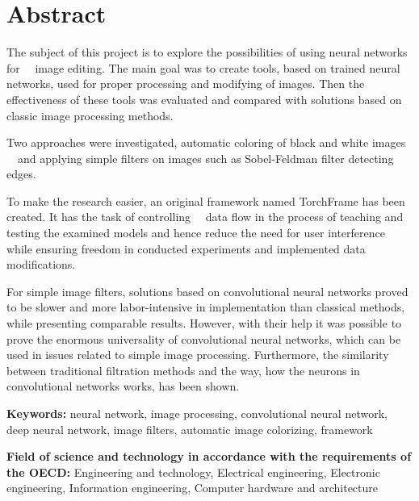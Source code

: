 \section*{Abstract}

  The subject of this project is to explore the possibilities of using neural networks for
  image editing. The main goal was to create tools, based on
  trained neural networks, used for proper processing and modifying of
  images. Then the effectiveness of these tools was evaluated and
  compared with solutions based on classic image processing methods.

  Two approaches were investigated, automatic coloring of black and white images
  and applying simple filters on images such as Sobel-Feldman filter detecting edges.

  To make the research easier, an original framework named TorchFrame has been created.
  It has the task of controlling
  data flow in the process of teaching and testing the examined models and hence
  reduce the need for user interference while ensuring freedom
  in conducted experiments and implemented data modifications.

  For simple image filters, solutions based on convolutional neural networks proved to
  be slower and more labor-intensive in implementation than classical methods,
  while presenting comparable results.
  However, with their help it was possible to prove the enormous universality
  of convolutional neural networks, which can be used in issues related to
  simple image processing. Furthermore, the similarity between traditional filtration
  methods and the way, how the neurons in convolutional networks works, has been shown.

  \bigskip

  \noindent\textbf{Keywords:} neural network, image processing, convolutional
  neural network, deep neural network,
  image filters, automatic image colorizing, framework

  \bigskip

  \noindent\textbf{Field of science and technology in accordance with the
  requirements of the OECD:} Engineering and technology, Electrical engineering,
  Electronic engineering, Information engineering, Computer hardware and
  architecture
